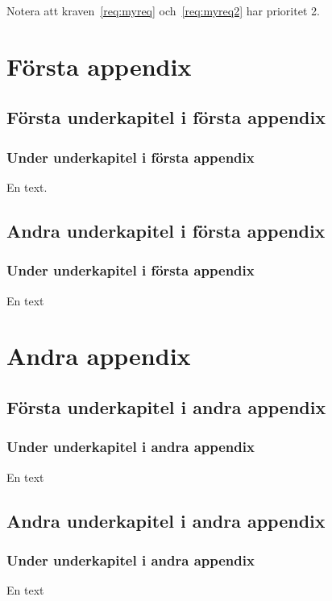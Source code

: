 \documentclass[10pt,oneside,swedish]{lips-no_customer}
\begin{document}
Notera att kraven~\ref{req:myreq} och~\ref{req:myreq2} har prioritet 2.

\clearpage


\cleardoublepage
\appendix
\section{Första appendix}
\subsection{Första underkapitel i första appendix}
\lipsum[5]

\subsubsection{Under underkapitel i första appendix}
En text.

\subsection{Andra underkapitel i första appendix}
\lipsum[5]
\subsubsection{Under underkapitel i första appendix}
En text

\section{Andra appendix}
\subsection{Första underkapitel i andra appendix}
\lipsum[5]

\subsubsection{Under underkapitel i andra appendix}
En text

\subsection{Andra underkapitel i andra appendix}
\lipsum[5]
\subsubsection{Under underkapitel i andra appendix}
En text
\end{document}
